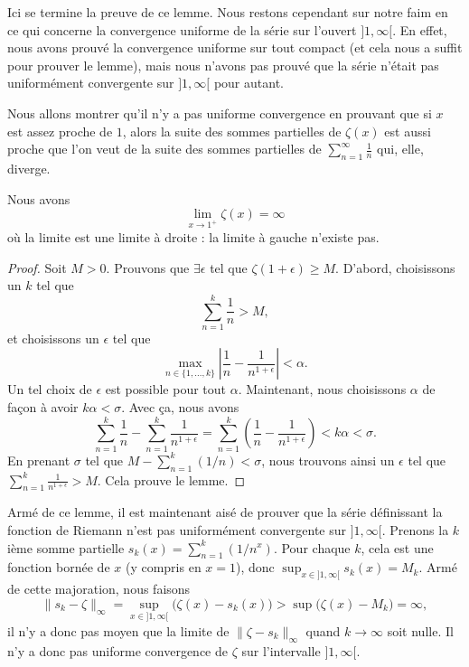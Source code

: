 Ici se termine la preuve de ce lemme. Nous restons cependant sur notre faim en ce qui concerne la convergence uniforme de la série sur l'ouvert \( ]1,\infty[\). En effet, nous avons prouvé la convergence uniforme sur tout compact (et cela nous a suffit pour prouver le lemme), mais nous n'avons pas prouvé que la série n'était pas uniformément convergente sur \( ]1,\infty[\) pour autant.

			Nous allons montrer qu'il n'y a pas uniforme convergence en prouvant que si \( x\) est assez proche de \( 1\), alors la suite des sommes partielles de \( \zeta(x)\) est aussi proche que l'on veut de la suite des sommes partielles de \( \sum_{n=1}^{\infty}\frac{1}{ n }\) qui, elle, diverge.

			\begin{lemma}
				Nous avons
				\begin{equation}
					\lim_{x\to 1^+}\zeta(x)=\infty
				\end{equation}
				où la limite est une limite à droite : la limite à gauche n'existe pas.
			\end{lemma}

			\begin{proof}
				Soit \( M>0\). Prouvons que \( \exists\epsilon\) tel que \( \zeta(1+\epsilon)\geq M\). D'abord, choisissons un \( k\) tel que
				\begin{equation}
					\sum_{n=1}^k\frac{1}{ n }>M,
				\end{equation}
				et choisissons un \( \epsilon\) tel que
				\begin{equation}
					\max_{n\in\{ 1,\ldots,k \}}\left|  \frac{1}{ n }-\frac{1}{ n^{1+\epsilon} }\right|<\alpha.
				\end{equation}
				Un tel choix de \( \epsilon\) est possible pour tout \( \alpha\). Maintenant, nous choisissons \( \alpha\) de façon à avoir \( k\alpha<\sigma\). Avec ça, nous avons
				\begin{equation}
					\sum_{n=1}^k\frac{1}{ n }-\sum_{n=1}^k\frac{1}{ n^{1+\epsilon} }=\sum_{n=1}^k\left( \frac{1}{ n }-\frac{1}{ n^{1+\epsilon} } \right)<k\alpha<\sigma.
				\end{equation}
				En prenant \( \sigma\) tel que \( M-\sum_{n=1}^k(1/n)<\sigma\), nous trouvons ainsi un \( \epsilon\) tel que \( \sum_{n=1}^k\frac{1}{ n^{1+\epsilon} }>M\). Cela prouve le lemme.
			\end{proof}

			Armé de ce lemme, il est maintenant aisé de prouver que la série définissant la fonction de Riemann n'est pas uniformément convergente sur \( ]1,\infty[\). Prenons la \( k\)ième somme partielle \( s_k(x)=\sum_{n=1}^k(1/n^x)\). Pour chaque \( k\), cela est une fonction bornée de \( x\) (y compris en \( x=1\)), donc \( \sup_{x\in]1,\infty[}s_k(x)=M_k\). Armé de cette majoration, nous faisons
\begin{equation}
	\| s_k-\zeta \|_{\infty}=\sup_{x\in]1,\infty[}\big( \zeta(x)-s_k(x) \big)>\sup\big( \zeta(x)-M_k \big)=\infty,
\end{equation}
il n'y a donc pas moyen que la limite de \( \| \zeta-s_k \|_{\infty}\) quand \( k\to\infty\) soit nulle. Il n'y a donc pas uniforme convergence de \( \zeta\) sur l'intervalle \( ]1,\infty[\).

